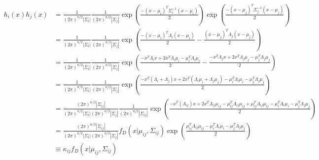 \documentclass{article}
\begin{document}
\begin{align*}
h_i(x)h_j(x) 
&=\frac{1}{(2\pi)^{n/2}|\Sigma_i|}
\frac{1}{(2\pi)^{n/2}|\Sigma_j|}
\exp(\frac{-(x-\mu_i)^T\Sigma_i^{-1}(x-\mu_i)}{2})
\exp(\frac{-(x-\mu_j)^T\Sigma_j^{-1}(x-\mu_j)}{2})\\
&=\frac{1}{(2\pi)^{n/2}|\Sigma_i|}
\frac{1}{(2\pi)^{n/2}|\Sigma_j|}
\exp(\frac{-(x-\mu_i)^T\Lambda_i(x-\mu_i)}{2}-\frac{(x-\mu_j)^T\Lambda_j(x-\mu_j)}{2})\\
&=\frac{1}{(2\pi)^{n/2}|\Sigma_i|}
\frac{1}{(2\pi)^{n/2}|\Sigma_j|}
\exp(\frac{-x^T\Lambda_ix+2x^T\Lambda_i\mu_i-\mu_i^T\Lambda_i\mu_i}{2}-\frac{-x^T\Lambda_jx+2x^T\Lambda_j\mu_j-\mu_j^T\Lambda_j\mu_j}{2})\\
&=\frac{1}{(2\pi)^{n/2}|\Sigma_i|}
\frac{1}{(2\pi)^{n/2}|\Sigma_j|}
\exp(\frac{-x^T(\Lambda_i+\Lambda_j)x
+2x^T(\Lambda_i\mu_i+\Lambda_j\mu_j)
-\mu_i^T\Lambda_i\mu_i-\mu_j^T\Lambda_j\mu_j}{2})\\
&=\frac{(2\pi)^{n/2}|\Sigma_{ij}|}{(2\pi)^{n/2}|\Sigma_i|(2\pi)^{n/2}|\Sigma_j|}
\frac{1}{(2\pi)^{n/2}|\Sigma_{ij}|}
\exp(\frac{
	-x^T(\Lambda_{ij})x 
	+2x^T\Lambda_{ij}\mu_{ij}
	-\mu_{ij}^T\Lambda_{ij}\mu_{ij}
	+\mu_{ij}^T\Lambda_{ij}\mu_{ij}
	-\mu_i^T\Lambda_i\mu_i-\mu_j^T\Lambda_j\mu_j
}{2})\\
&=\frac{(2\pi)^{n/2}|\Sigma_{ij}|}{(2\pi)^{n/2}|\Sigma_i|(2\pi)^{n/2}|\Sigma_j|}
 f_D(x|\mu_{ij}, \Sigma_{ij})
\exp(\frac{
	\mu_{ij}^T\Lambda_{ij}\mu_{ij}
	-\mu_i^T\Lambda_i\mu_i-\mu_j^T\Lambda_j\mu_j
}{2})\\
&\equiv \kappa_{ij} f_D(x|\mu_{ij}, \Sigma_{ij})\\
\end{align*}
\end{document}
